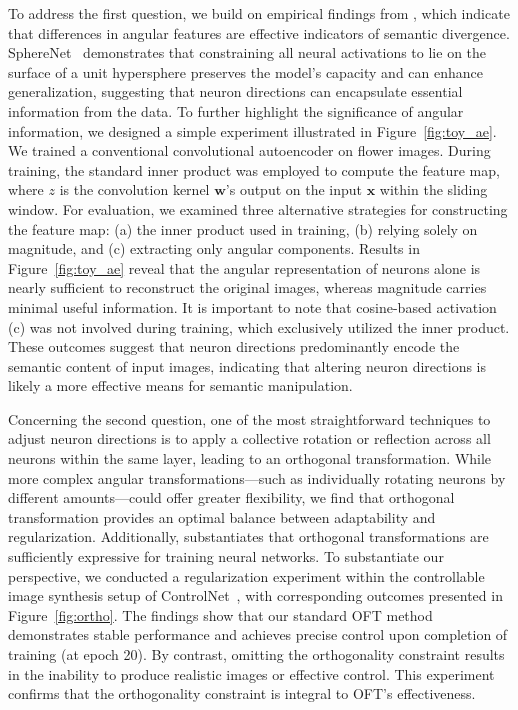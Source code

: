To address the first question, we build on empirical findings from \cite{liu2018decoupled,chen2020angular}, which indicate that differences in angular features are effective indicators of semantic divergence. SphereNet~\cite{liu2017deep} demonstrates that constraining all neural activations to lie on the surface of a unit hypersphere preserves the model's capacity and can enhance generalization, suggesting that neuron directions can encapsulate essential information from the data. To further highlight the significance of angular information, we designed a simple experiment illustrated in Figure~\ref{fig:toy_ae}. We trained a conventional convolutional autoencoder on flower images. During training, the standard inner product was employed to compute the feature map, where $z$ is the convolution kernel $\bm{w}$'s output on the input $\bm{x}$ within the sliding window. For evaluation, we examined three alternative strategies for constructing the feature map: (a) the inner product used in training, (b) relying solely on magnitude, and (c) extracting only angular components. Results in Figure~\ref{fig:toy_ae} reveal that the angular representation of neurons alone is nearly sufficient to reconstruct the original images, whereas magnitude carries minimal useful information. It is important to note that cosine-based activation (c) was not involved during training, which exclusively utilized the inner product. These outcomes suggest that neuron directions predominantly encode the semantic content of input images, indicating that altering neuron directions is likely a more effective means for semantic manipulation.

Concerning the second question, one of the most straightforward techniques to adjust neuron directions is to apply a collective rotation or reflection across all neurons within the same layer, leading to an orthogonal transformation. While more complex angular transformations—such as individually rotating neurons by different amounts—could offer greater flexibility, we find that orthogonal transformation provides an optimal balance between adaptability and regularization. Additionally, \cite{liu2021orthogonal} substantiates that orthogonal transformations are sufficiently expressive for training neural networks. To substantiate our perspective, we conducted a regularization experiment within the controllable image synthesis setup of ControlNet~\cite{zhang2023adding}, with corresponding outcomes presented in Figure~\ref{fig:ortho}. The findings show that our standard OFT method demonstrates stable performance and achieves precise control upon completion of training (at epoch 20). By contrast, omitting the orthogonality constraint results in the inability to produce realistic images or effective control. This experiment confirms that the orthogonality constraint is integral to OFT’s effectiveness.

